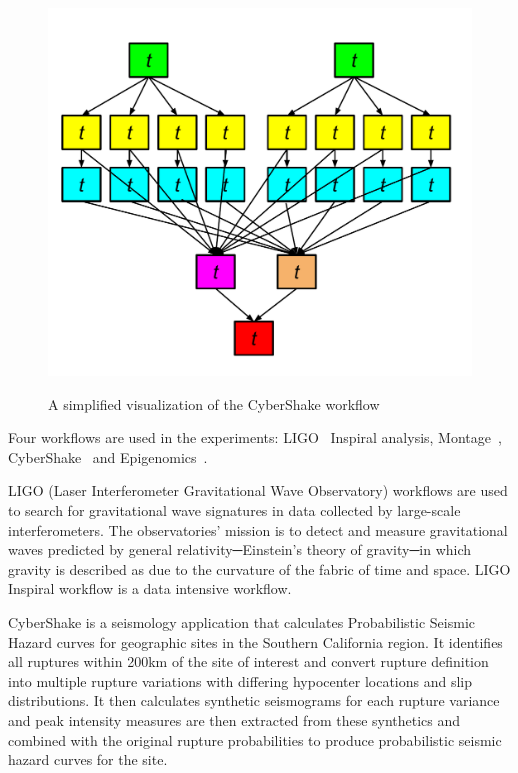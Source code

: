\begin{figure}[htb]
	\centering
	\includegraphics[width=0.8\linewidth]{figures/evaluation/cybershake.pdf} \\
	\caption{A simplified visualization of the CyberShake workflow}
	\label{fig:evaluation_shape_cybershake}
\end{figure}



Four workflows are used in the experiments: LIGO~\cite{LIGO} Inspiral analysis, Montage~\cite{Berriman2004}, CyberShake~\cite{Graves2010} and Epigenomics~\cite{Epigenome}. 

LIGO (Laser Interferometer Gravitational Wave Observatory) workflows are used to search for gravitational wave signatures in data collected by large-scale interferometers. The observatories' mission is to detect and measure gravitational waves predicted by general relativity─Einstein's theory of gravity─in which gravity is described as due to the curvature of the fabric of time and space. LIGO Inspiral workflow is a data intensive workflow. 

CyberShake is a seismology application that calculates Probabilistic Seismic Hazard curves for geographic sites in the Southern California region. It identifies all ruptures within 200km of the site of interest and convert rupture definition into multiple rupture variations with differing hypocenter locations and slip distributions. It then calculates synthetic seismograms for each rupture variance and peak intensity measures are then extracted from these synthetics and combined with the original rupture probabilities to produce probabilistic seismic hazard curves for the site.  


